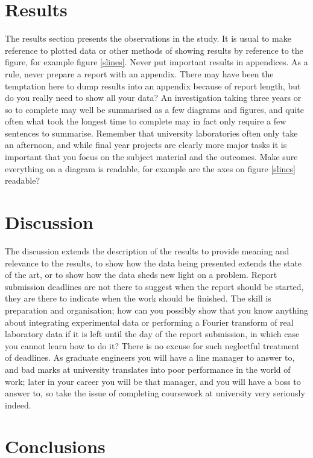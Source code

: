 \documentclass[11pt,a4]{article}
\begin{document}
\section{Results}
The results section presents the observations in the study. It is usual to make reference to plotted data or other methods of showing results by reference to the figure, for example figure \ref{slines}. Never put important results in appendices. As a rule, never prepare a report with an appendix. There may have been the temptation here to dump results into an appendix because of report length, but do you really need to show all your data? An investigation taking three years or so to complete may well be summarised as a few diagrams and figures, and quite often what took the longest time to complete may in fact only require a few sentences to summarise. Remember that university laboratories often only take an afternoon, and while final year projects are clearly more major tasks it is important that you focus on the subject material and the outcomes. Make sure everything on a diagram is readable, for example are the axes on figure \ref{slines} readable?

\section {Discussion}
The discussion extends the description of the results to provide meaning and relevance to the results, to show how the data being presented extends the state of the art, or to show how the data sheds new light on a problem. Report submission deadlines are not there to suggest when the report should be started, they are there to indicate when the work should be finished. The skill is preparation and organisation; how can you possibly show that you know anything about integrating experimental data or performing a Fourier transform of real laboratory data if it is left until the day of the report submission, in which case you cannot learn how to do it? There is no excuse for such neglectful treatment of deadlines. As graduate engineers you will have a line manager to answer to, and bad marks at university translates into poor performance in the world of work; later in your career you will be that manager, and you will have a boss to answer to, so take the issue of completing coursework at university very seriously indeed.

\section {Conclusions}
\end{document}
